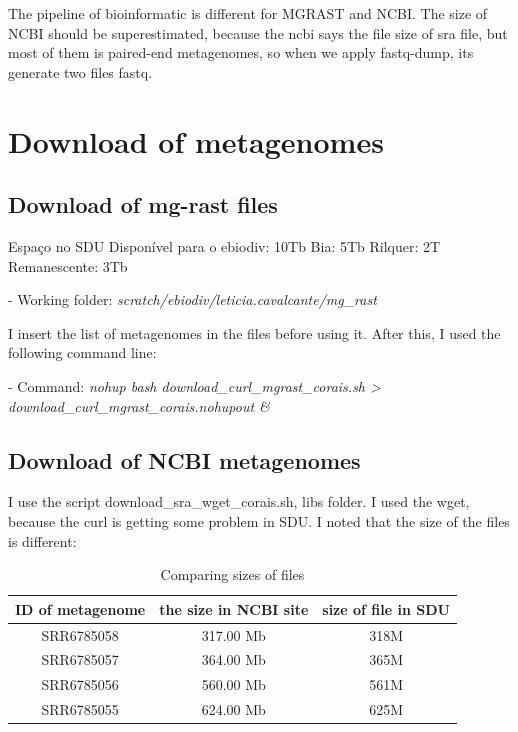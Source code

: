 \documentclass[12pt, a4paper]{report}
\begin{document}
The pipeline of bioinformatic is different for MG\-RAST and NCBI.
The size of NCBI should be superestimated, because the ncbi says the file size of sra file, but most of them is paired-end metagenomes, so when we apply fastq-dump, its generate two files fastq. 

\chapter{Download of metagenomes}
\section{Download of mg-rast files} 
Espaço no SDU
Disponível para o ebiodiv: 10Tb
Bia: 5Tb
Rilquer: 2T
Remanescente: 3Tb

\begin{tcolorbox}[width=6.3in]
 \scriptsize 
 - Working folder: \textit{scratch/ebiodiv/leticia.cavalcante/mg\_rast}
 \end{tcolorbox}

I insert the list of metagenomes in the files before using it. After this, I used the following command line:

\begin{tcolorbox}[width=6.3in]
 \scriptsize 
 - Command: \textit{nohup bash download\_curl\_mgrast\_corais.sh > download\_curl\_mgrast\_corais.nohupout \&}
 \end{tcolorbox}

\section{Download of NCBI metagenomes}
I use the script download\_sra\_wget\_corais.sh, libs folder. I used the wget, because the curl is getting some problem in SDU.
I noted that the size of the files is different:


\begin{table}[!htb]
  \caption{Comparing sizes of files}
  \centering
  \begin{tabular}{ccc}
  \hline 
       ID of metagenome&the size in NCBI site&size of file in SDU\\
  \hline
	SRR6785058&317.00 Mb&318M\\
	SRR6785057&364.00 Mb&365M\\
	SRR6785056&560.00 Mb&561M\\
	SRR6785055&624.00 Mb&625M\\
  \hline
  \end{tabular}
  \label{table2}
 \end{table}
\end{document}
